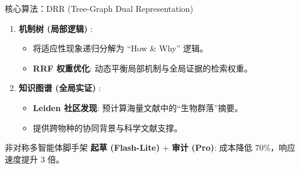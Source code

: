 \documentclass[aspectratio=169, 11pt]{ctexbeamer}
\begin{document}
\begin{frame}{核心算法：DRR (Tree-Graph Dual Representation)}
    \begin{enumerate}
        \item \textbf{机制树 (局部逻辑)} \cite{zhu2025taxonomy}: 
        \begin{itemize}
            \item 将适应性现象递归分解为 “How \& Why” 逻辑。
            \item \textbf{RRF 权重优化}: 动态平衡局部机制与全局证据的检索权重。
        \end{itemize}
        \pause
        \item \textbf{知识图谱 (全局实证)} \cite{microsoft2024graphrag}: 
        \begin{itemize}
            \item \textbf{Leiden 社区发现}: 预计算海量文献中的“生物群落”摘要。
            \item 提供跨物种的协同背景与科学文献支撑。
        \end{itemize}
    \end{enumerate}
    \pause
    \begin{block}{非对称多智能体脚手架}
        \small \textbf{起草 (Flash-Lite)} + \textbf{审计 (Pro)}: 成本降低 70\%，响应速度提升 3 倍。
    \end{block}
\end{frame}
\end{document}
